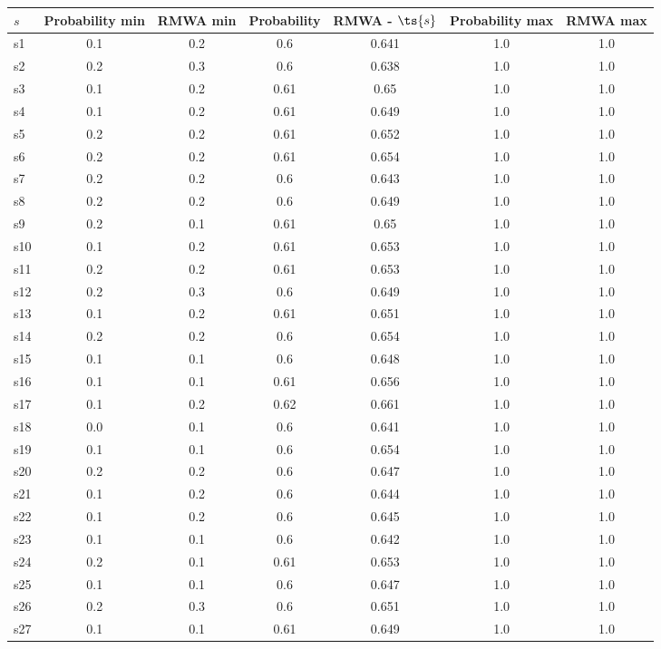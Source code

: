 \documentclass{article}
\begin{document}
\noindent\begin{tabular}{|l|c|c|c|c|c|c|}
\hline
$s$& Probability min & RMWA min & Probability & RMWA - $\ts{s}$ & Probability max & RMWA max\\
\hline
s1 &0.1 & 0.2 & 0.6 & 0.641 & 1.0 & 1.0\\
\hline
s2 &0.2 & 0.3 & 0.6 & 0.638 & 1.0 & 1.0\\
\hline
s3 &0.1 & 0.2 & 0.61 & 0.65 & 1.0 & 1.0\\
\hline
s4 &0.1 & 0.2 & 0.61 & 0.649 & 1.0 & 1.0\\
\hline
s5 &0.2 & 0.2 & 0.61 & 0.652 & 1.0 & 1.0\\
\hline
s6 &0.2 & 0.2 & 0.61 & 0.654 & 1.0 & 1.0\\
\hline
s7 &0.2 & 0.2 & 0.6 & 0.643 & 1.0 & 1.0\\
\hline
s8 &0.2 & 0.2 & 0.6 & 0.649 & 1.0 & 1.0\\
\hline
s9 &0.2 & 0.1 & 0.61 & 0.65 & 1.0 & 1.0\\
\hline
s10 &0.1 & 0.2 & 0.61 & 0.653 & 1.0 & 1.0\\
\hline
s11 &0.2 & 0.2 & 0.61 & 0.653 & 1.0 & 1.0\\
\hline
s12 &0.2 & 0.3 & 0.6 & 0.649 & 1.0 & 1.0\\
\hline
s13 &0.1 & 0.2 & 0.61 & 0.651 & 1.0 & 1.0\\
\hline
s14 &0.2 & 0.2 & 0.6 & 0.654 & 1.0 & 1.0\\
\hline
s15 &0.1 & 0.1 & 0.6 & 0.648 & 1.0 & 1.0\\
\hline
s16 &0.1 & 0.1 & 0.61 & 0.656 & 1.0 & 1.0\\
\hline
s17 &0.1 & 0.2 & 0.62 & 0.661 & 1.0 & 1.0\\
\hline
s18 &0.0 & 0.1 & 0.6 & 0.641 & 1.0 & 1.0\\
\hline
s19 &0.1 & 0.1 & 0.6 & 0.654 & 1.0 & 1.0\\
\hline
s20 &0.2 & 0.2 & 0.6 & 0.647 & 1.0 & 1.0\\
\hline
s21 &0.1 & 0.2 & 0.6 & 0.644 & 1.0 & 1.0\\
\hline
s22 &0.1 & 0.2 & 0.6 & 0.645 & 1.0 & 1.0\\
\hline
s23 &0.1 & 0.1 & 0.6 & 0.642 & 1.0 & 1.0\\
\hline
s24 &0.2 & 0.1 & 0.61 & 0.653 & 1.0 & 1.0\\
\hline
s25 &0.1 & 0.1 & 0.6 & 0.647 & 1.0 & 1.0\\
\hline
s26 &0.2 & 0.3 & 0.6 & 0.651 & 1.0 & 1.0\\
\hline
s27 &0.1 & 0.1 & 0.61 & 0.649 & 1.0 & 1.0\\

\end{tabular}
\end{document}
